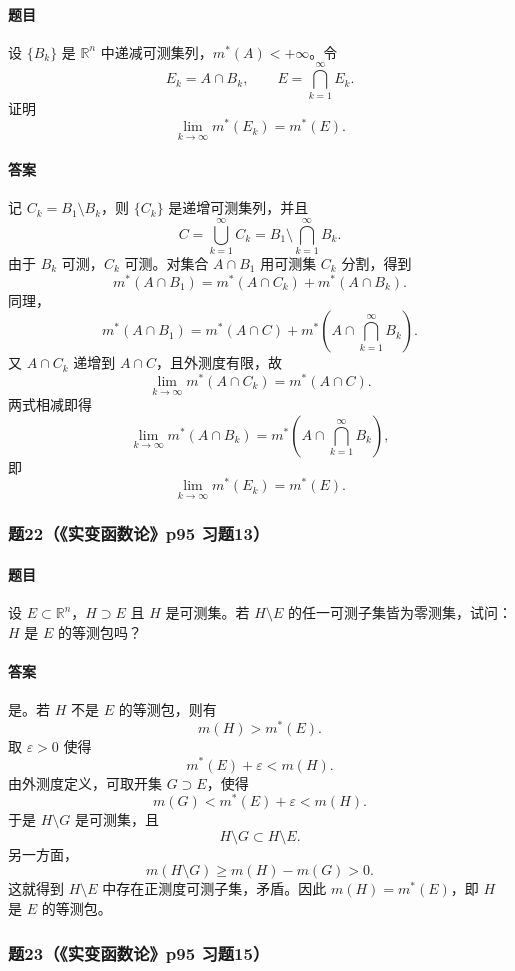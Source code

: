 \documentclass{article}
\newcommand{\R}{\mathbb{R}}
\newcommand{\eps}{\varepsilon}
\newcommand{\meas}{m}
\newcommand{\mouter}{m^*}
\begin{document}
\paragraph{题目}设 $\{B_k\}$ 是 $\R^n$ 中递减可测集列，$\mouter(A)<+\infty$。令
\[
E_k=A\cap B_k,
\qquad
E=\bigcap_{k=1}^{\infty}E_k.
\]
证明
\[
\lim_{k\to\infty}\mouter(E_k)=\mouter(E).
\]

\paragraph{答案}记 $C_k=B_1\setminus B_k$，则 $\{C_k\}$ 是递增可测集列，并且
\[
C=\bigcup_{k=1}^{\infty}C_k=B_1\setminus\bigcap_{k=1}^{\infty}B_k.
\]
由于 $B_k$ 可测，$C_k$ 可测。对集合 $A\cap B_1$ 用可测集 $C_k$ 分割，得到
\[
\mouter(A\cap B_1)=\mouter(A\cap C_k)+\mouter(A\cap B_k).
\]
同理，
\[
\mouter(A\cap B_1)=\mouter(A\cap C)+\mouter\left(A\cap\bigcap_{k=1}^{\infty}B_k\right).
\]
又 $A\cap C_k$ 递增到 $A\cap C$，且外测度有限，故
\[
\lim_{k\to\infty}\mouter(A\cap C_k)=\mouter(A\cap C).
\]
两式相减即得
\[
\lim_{k\to\infty}\mouter(A\cap B_k)
=
\mouter\left(A\cap\bigcap_{k=1}^{\infty}B_k\right),
\]
即
\[
\lim_{k\to\infty}\mouter(E_k)=\mouter(E).
\]

\subsubsection*{题22（《实变函数论》p95 习题13）}
\paragraph{题目}设 $E\subset\R^n$，$H\supset E$ 且 $H$ 是可测集。若 $H\setminus E$ 的任一可测子集皆为零测集，试问：$H$ 是 $E$ 的等测包吗？

\paragraph{答案}是。若 $H$ 不是 $E$ 的等测包，则有
\[
\meas(H)>\mouter(E).
\]
取 $\eps>0$ 使得
\[
\mouter(E)+\eps<\meas(H).
\]
由外测度定义，可取开集 $G\supset E$，使得
\[
\meas(G)<\mouter(E)+\eps<\meas(H).
\]
于是 $H\setminus G$ 是可测集，且
\[
H\setminus G\subset H\setminus E.
\]
另一方面，
\[
\meas(H\setminus G)
\ge \meas(H)-\meas(G)>0.
\]
这就得到 $H\setminus E$ 中存在正测度可测子集，矛盾。因此 $\meas(H)=\mouter(E)$，即 $H$ 是 $E$ 的等测包。

\subsubsection*{题23（《实变函数论》p95 习题15）}
\end{document}
